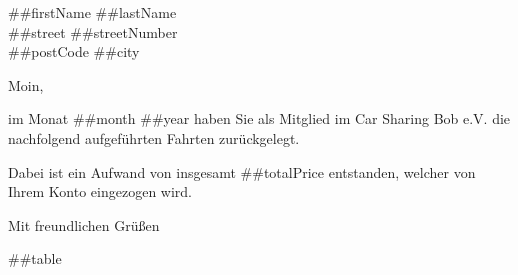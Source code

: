 \documentclass[%
    parskip=half,
    fromalign=right,  %
    fromphone=false, fromfax=false,
    fromrule=false]{scrlttr2}
\begin{document}
\begin{letter}{ ##firstName ##lastName \\ ##street ##streetNumber\\ ##postCode ##city }

\opening{Moin,}

im Monat ##month ##year haben Sie als Mitglied im Car Sharing Bob e.V. die nachfolgend aufgeführten Fahrten zurückgelegt.

Dabei ist ein Aufwand von insgesamt ##totalPrice entstanden, welcher von Ihrem Konto eingezogen wird.

\closing{Mit freundlichen Grüßen}



\small
##table

\end{letter}
\end{document}
